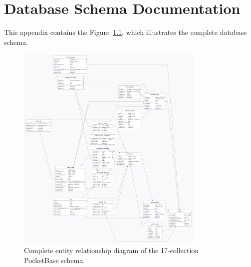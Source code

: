 \chapter{Database Schema Documentation} \label{app:database_schema}

This appendix contains the Figure~\ref{fig:complete_database_erd}, which illustrates the complete database schema.

\begin{figure}[htbp]
    \centering
    \includegraphics[width=0.8\textwidth]{figs/appendix/pb_diagram.png}
    \caption{Complete entity relationship diagram of the 17-collection PocketBase schema.}
    \label{fig:complete_database_erd}
\end{figure}
